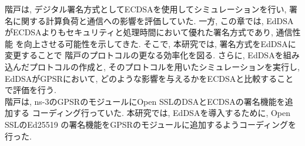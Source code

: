 \indent 階戸\cite{shinato}は, デジタル署名方式としてECDSAを使用してシミュレーションを行い, 
署名に関する計算負荷と通信への影響を評価していた. 
一方, この章では, EdDSAがECDSAよりもセキュリティと処理時間において優れた署名方式であり, 通信性能
を向上させる可能性を示してきた. そこで, 本研究では, 署名方式をEdDSAに変更することで
階戸のプロトコルの更なる効率化を図る. さらに, EdDSAを組み込んだプロトコルの作成と, 
そのプロトコルを用いたシミュレーションを実行し, EdDSAがGPSRにおいて, 
どのような影響を与えるかをECDSAと比較することで評価を行う. \\
\indent 階戸は, ns-3のGPSRのモジュールにOpen SSLのDSAとECDSAの署名機能を追加する
コーディング行っていた. 本研究では, EdDSAを導入するために, Open SSLのEd25519
\cite{openssl-eddsa}の署名機能をGPSRのモジュールに追加するようコーディングを行った. \\